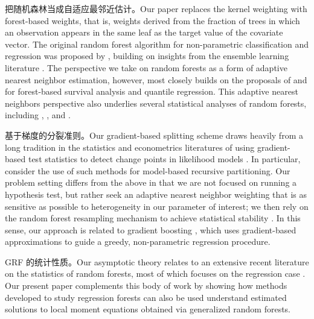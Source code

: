 \documentclass[aos]{imsart}
\theoremstyle{plain}
\theoremstyle{definition}
\theoremstyle{remark}
\begin{document}
\begin{CJK}{UTF8}{gbsn}
把随机森林当成自适应最邻近估计。Our paper replaces the kernel weighting with forest-based weights, that is,
weights derived from the fraction of trees in which an observation
appears in the same leaf as the target value of the covariate vector.  The original random
forest algorithm for non-parametric classification and regression
was proposed by \citet{breiman2001random}, building on insights from the ensemble learning
literature \citep{amit1997shape,breiman1996bagging,dietterich2000experimental,ho1998random}.
The perspective we take on random forests as a form of
adaptive nearest neighbor estimation, however, most closely builds on the proposals of
\citet{hothorn2004bagging} and \citet{meinshausen2006quantile} for forest-based survival
analysis and quantile regression. This adaptive
nearest neighbors perspective also underlies several statistical analyses of random forests,
including \citet{arlot2014analysis}, \citet{biau2010layered}, and \citet{lin2006random}.

基于梯度的分裂准则。Our gradient-based splitting scheme draws heavily from a long tradition in the statistics and
econometrics literatures of using gradient-based test statistics to detect change points in likelihood models
\citep{andrews1993tests,hansen1992testing,hjort2002tests,nyblom1989testing,
ploberger1992cusum,zeileis2005unified,zeileis2007generalized}.
In particular, \citet{zeileis2008model} consider the use of such methods for
model-based recursive partitioning. Our problem setting differs from the above
in that we are not focused on running a hypothesis test, but rather seek an adaptive
nearest neighbor weighting that is as sensitive as possible to heterogeneity in our
parameter of interest; we then rely on the random forest resampling mechanism
to achieve statistical stability \citep{mentch2016quantifying,scornet2015consistency,wager2015estimation}.
In this sense, our approach is related to gradient boosting
\citep{friedman2001greedy}, which uses gradient-based approximations to guide
a greedy, non-parametric regression procedure.

GRF 的统计性质。Our asymptotic theory relates to an extensive recent literature on the statistics of random forests, most
of which focuses on the regression case
\citep{arlot2014analysis,biau2012analysis,biau2008consistency,biau2016random,
buhlmann2002analyzing,denil2014narrowing,geurts2006extremely,
ishwaran2010consistency,lin2006random,meinshausen2006quantile,mentch2016quantifying,
scornet2015consistency,sexton2009standard,wager2015estimation,wager2015uniform,zhu2015reinforcement}.
Our present paper complements this body of work by showing how methods developed
to study regression forests can also be used understand estimated solutions to local
moment equations obtained via generalized random forests.


\end{CJK}
\end{document}
